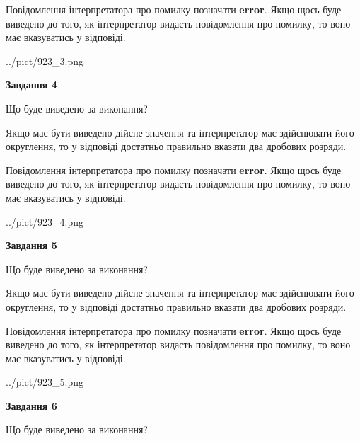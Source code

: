 \documentclass[12pt, ukrainian]{article}
\begin{document}
{\begin {Large}
Повідомлення інтерпретатора про помилку позначати \textbf{error}.
Якщо щось буде виведено до того, як інтерпретатор видасть повідомлення про помилку, 
то воно має вказуватись у відповіді. \par

\begin{center}
	{../pict/923_3.png}
\end{center}
\newpage

{\begin {center}\textbf{Завдання 4}\end {center}}\par
Що буде виведено за виконання? \par

Якщо має бути виведено дійсне значення та інтерпретатор має здійснювати його округлення, 
то у відповіді достатньо правильно вказати два дробових розряди.

Повідомлення інтерпретатора про помилку позначати \textbf{error}.
Якщо щось буде виведено до того, як інтерпретатор видасть повідомлення про помилку, 
то воно має вказуватись у відповіді. \par

\begin{center}
	{../pict/923_4.png}
\end{center}
\newpage

{\begin {center}\textbf{Завдання 5}\end {center}}\par
Що буде виведено за виконання? \par

Якщо має бути виведено дійсне значення та інтерпретатор має здійснювати його округлення, 
то у відповіді достатньо правильно вказати два дробових розряди.

Повідомлення інтерпретатора про помилку позначати \textbf{error}.
Якщо щось буде виведено до того, як інтерпретатор видасть повідомлення про помилку, 
то воно має вказуватись у відповіді. \par

\begin{center}
	{../pict/923_5.png}
\end{center}
\newpage

{\begin {center}\textbf{Завдання 6}\end {center}}\par
Що буде виведено за виконання? \par


\end{Large}}
\end{document}
